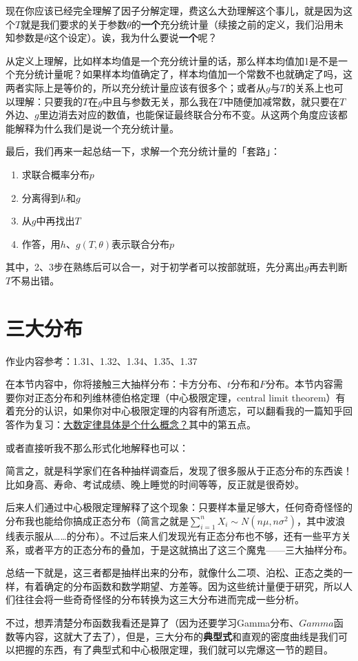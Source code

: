 \documentclass[10pt, a4paper]{article}
\begin{document}
现在你应该已经完全理解了因子分解定理，费这么大劲理解这个事儿，就是因为这个$T$就是我们要求的关于参数$\theta$的\textbf{一个}充分统计量（续接之前的定义，我们沿用未知参数是$\theta$这个设定）。诶，我为什么要说\textbf{一个}呢？\par
从定义上理解，比如样本均值是一个充分统计量的话，那么样本均值加1是不是一个充分统计量呢？如果样本均值确定了，样本均值加一个常数不也就确定了吗，这两者实际上是等价的，所以充分统计量应该有很多个；或者从$g$与$T$的关系上也可以理解：只要我的$T$在$g$中且与参数无关，那么我在$T$中随便加减常数，就只要在$T$外边、$g$里边消去对应的数值，也能保证最终联合分布不变。从这两个角度应该都能解释为什么我们是说一个充分统计量。\\\par
最后，我们再来一起总结一下，求解一个充分统计量的「套路」：
\begin{enumerate}
    \item 求联合概率分布$p$
    \item 分离得到$h$和$g$
    \item 从$g$中再找出$T$
    \item 作答，用$h$、$g(T,\theta)$表示联合分布$p$
\end{enumerate}\par
其中，2、3步在熟练后可以合一，对于初学者可以按部就班，先分离出$g$再去判断$T$不易出错。


\section{三大分布}
作业内容参考：1.31、1.32、1.34、1.35、1.37\par
在本节内容中，你将接触三大抽样分布：卡方分布、$t$分布和$F$分布。本节内容需要你对正态分布和列维林德伯格定理（中心极限定理，central limit theorem）有着充分的认识，如果你对中心极限定理的内容有所遗忘，可以翻看我的一篇知乎回答作为复习：\href{https://www.zhihu.com/question/19911209/answer/876481176}{大数定律具体是个什么概念？}其中的第五点。\par
或者直接听我不那么形式化地解释也可以：\par 简言之，就是科学家们在各种抽样调查后，发现了很多服从于正态分布的东西诶！比如身高、寿命、考试成绩、晚上睡觉的时间等等，反正就是很奇妙。\par 后来人们通过中心极限定理解释了这个现象：只要样本量足够大，任何奇奇怪怪的分布我也能给你搞成正态分布（简言之就是$\sum_{i=1}^{n} X_{i} \sim N\left(n \mu, n \sigma^{2}\right)$，其中波浪线表示服从……的分布）。不过后来人们发现光有正态分布也不够，还有一些平方关系，或者平方的正态分布的叠加，于是这就搞出了这三个魔鬼——三大抽样分布。\par
总结一下就是，这三者都是抽样出来的分布，就像什么二项、泊松、正态之类的一样，有着确定的分布函数和数学期望、方差等。因为这些统计量便于研究，所以人们往往会将一些奇奇怪怪的分布转换为这三大分布进而完成一些分析。\par 不过，想弄清楚分布函数我看还是算了（因为还要学习Gamma分布、$Gamma$函数等内容，这就大了去了），但是，三大分布的\textbf{典型式}和直观的密度曲线是我们可以把握的东西，有了典型式和中心极限定理，我们就可以完爆这一节的题目。
\end{document}
